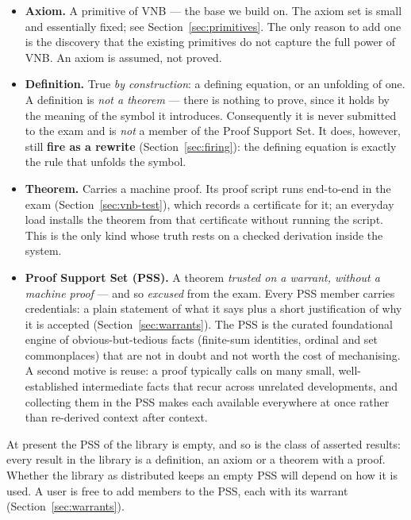 \begin{itemize}
\item \textbf{Axiom.} A primitive of VNB --- the base we build on.  The
  axiom set is small and essentially fixed; see
  Section~\ref{sec:primitives}.  The only reason to add one is the
  discovery that the existing primitives do not capture the full power of
  VNB.  An axiom is assumed, not proved.

\item \textbf{Definition.} True \emph{by construction}: a defining
  equation, or an unfolding of one.  A definition is \emph{not a theorem}
  --- there is nothing to prove, since it holds by the meaning of the
  symbol it introduces.  Consequently it is never submitted to the exam
  and is \emph{not} a member of the Proof Support Set.  It does,
  however, still \textbf{fire as a rewrite} (Section~\ref{sec:firing}):
  the defining equation is exactly the rule that unfolds the symbol.

\item \textbf{Theorem.} Carries a machine proof.  Its proof script runs
  end-to-end in the exam (Section~\ref{sec:vnb-test}), which records a
  certificate for it; an everyday load installs the theorem from that
  certificate without running the script.  This is the only kind whose truth rests
  on a checked derivation inside the system.

\item \textbf{Proof Support Set (PSS).} A theorem \emph{trusted on a
  warrant, without a machine proof} --- and so \emph{excused} from the
  exam.  Every PSS member carries credentials: a plain statement of what
  it says plus a short justification of why it is accepted
  (Section~\ref{sec:warrants}).  The PSS is the curated foundational
  engine of obvious-but-tedious facts (finite-sum identities, ordinal and
  set commonplaces) that are not in doubt and not worth the cost of
  mechanising.  A second motive is reuse: a proof typically calls on many
  small, well-established intermediate facts that recur across unrelated
  developments, and collecting them in the PSS makes each available
  everywhere at once rather than re-derived context after context.
\end{itemize}

At present the PSS of the library is empty, and so is the class of
asserted results: every result in the library is a definition, an axiom
or a theorem with a proof.  Whether the
library as distributed keeps an empty PSS will depend on how it is
used.  A user is free to add members to the PSS, each with its warrant
(Section~\ref{sec:warrants}).

